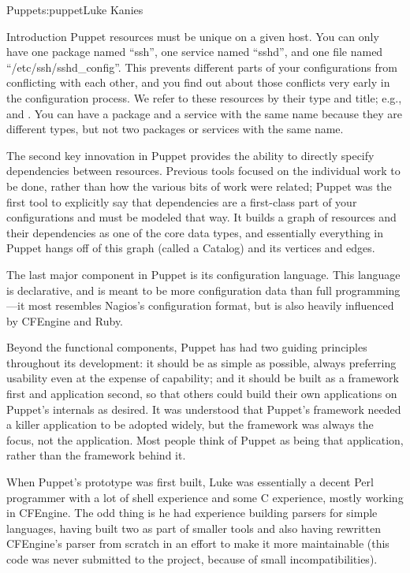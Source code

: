 \begin{aosachapter}{Puppet}{s:puppet}{Luke Kanies}
\begin{aosasect1}{Introduction}
Puppet resources must be unique on a given host.  You can only have
one package named ``ssh'', one service named ``sshd'', and one file named
``/etc/ssh/sshd\_config''.  This prevents different parts of your
configurations from conflicting with each other, and you find out
about those conflicts very early in the configuration process.  We
refer to these resources by their type and title; e.g., 
and .  You can have a package and a service with the same
name because they are different types, but not two packages or
services with the same name.

The second key innovation in Puppet provides the ability to directly
specify dependencies between resources.  Previous tools focused on the
individual work to be done, rather than how the various bits of work
were related; Puppet was the first tool to explicitly say that
dependencies are a first-class part of your configurations and must
be modeled that way.  It builds a graph of resources and their
dependencies as one of the core data types, and essentially everything
in Puppet hangs off of this graph (called a Catalog)
and its vertices and edges.

The last major component in Puppet is its configuration language.
This language is declarative, and is meant to be more configuration
data than full programming---it most resembles Nagios's configuration
format, but is also heavily influenced by CFEngine and Ruby.

Beyond the functional components, Puppet has had two guiding
principles throughout its development: it should be as simple as
possible, always preferring usability even at the expense of
capability; and it should be built as a framework first and
application second, so that others could build their own applications
on Puppet's internals as desired.  It was understood that Puppet's
framework needed a killer application to be adopted widely, but the
framework was always the focus, not the application.  Most people
think of Puppet as being that application, rather than the framework
behind it.

When Puppet's prototype was first built, Luke was essentially a decent
Perl programmer with a lot of shell experience and some C experience,
mostly working in CFEngine.  The odd thing is he had
experience building parsers for simple languages, having built two as
part of smaller tools and also having rewritten CFEngine's parser from
scratch in an effort to make it more maintainable (this code was never
submitted to the project, because of small incompatibilities).


\end{aosasect1}
\end{aosachapter}
